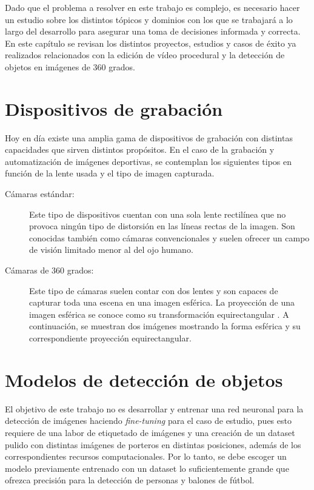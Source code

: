 Dado que el problema a resolver en este trabajo es complejo, es necesario hacer un estudio sobre los distintos tópicos y dominios con los que se trabajará a lo largo del desarrollo para asegurar una toma de decisiones informada y correcta. En este capítulo se revisan los distintos proyectos, estudios y casos de éxito ya realizados relacionados con la edición de vídeo procedural y la detección de objetos en imágenes de 360 grados.

\section[Dispositivos de grabación]{Dispositivos de grabación}
Hoy en día existe una amplia gama de dispositivos de grabación con distintas capacidades que sirven distintos propósitos. En el caso de la grabación y automatización de imágenes deportivas, se contemplan los siguientes tipos en función de la lente usada y el tipo de imagen capturada.
\begin{description}
	\item [Cámaras estándar:] Este tipo de dispositivos cuentan con una sola lente rectilínea que no provoca ningún tipo de distorsión en las líneas rectas de la imagen. Son conocidas también como cámaras convencionales y suelen ofrecer un campo de visión limitado menor al del ojo humano.
	\item [Cámaras de 360 grados:] Este tipo de cámaras suelen contar con dos lentes y son capaces de capturar toda una escena en una imagen esférica. La proyección de una imagen esférica se conoce como su transformación equirectangular \cite{zhang2018omnidirectional}. A continuación, se muestran dos imágenes mostrando la forma esférica y su correspondiente proyección equirectangular.
\end{description}

\section[Detección de objetos]{Modelos de detección de objetos}
El objetivo de este trabajo no es desarrollar y entrenar una red neuronal para la detección de imágenes haciendo \textit{fine-tuning} para el caso de estudio, pues esto requiere de una labor de etiquetado de imágenes y una creación de un dataset pulido con distintas imágenes de porteros en distintas posiciones, además de los correspondientes recursos computacionales. Por lo tanto, se debe escoger un modelo previamente entrenado con un dataset lo suficientemente grande que ofrezca precisión para la detección de personas y balones de fútbol.

